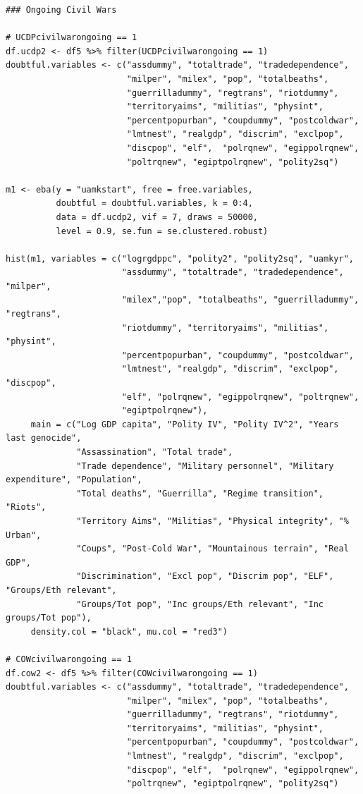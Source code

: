 \begin{verbatim}
### Ongoing Civil Wars

# UCDPcivilwarongoing == 1
df.ucdp2 <- df5 %>% filter(UCDPcivilwarongoing == 1)
doubtful.variables <- c("assdummy", "totaltrade", "tradedependence",
                        "milper", "milex", "pop", "totalbeaths",
                        "guerrilladummy", "regtrans", "riotdummy",
                        "territoryaims", "militias", "physint",
                        "percentpopurban", "coupdummy", "postcoldwar",
                        "lmtnest", "realgdp", "discrim", "exclpop",
                        "discpop", "elf",  "polrqnew", "egippolrqnew",
                        "poltrqnew", "egiptpolrqnew", "polity2sq")

m1 <- eba(y = "uamkstart", free = free.variables,
          doubtful = doubtful.variables, k = 0:4,
          data = df.ucdp2, vif = 7, draws = 50000,
          level = 0.9, se.fun = se.clustered.robust)
          
hist(m1, variables = c("logrgdppc", "polity2", "polity2sq", "uamkyr",
                       "assdummy", "totaltrade", "tradedependence", "milper",
                       "milex","pop", "totalbeaths", "guerrilladummy", "regtrans",
                       "riotdummy", "territoryaims", "militias", "physint",
                       "percentpopurban", "coupdummy", "postcoldwar",
                       "lmtnest", "realgdp", "discrim", "exclpop", "discpop",
                       "elf", "polrqnew", "egippolrqnew", "poltrqnew",
                       "egiptpolrqnew"),
     main = c("Log GDP capita", "Polity IV", "Polity IV^2", "Years last genocide",
              "Assassination", "Total trade", 
              "Trade dependence", "Military personnel", "Military expenditure", "Population", 
              "Total deaths", "Guerrilla", "Regime transition", "Riots",
              "Territory Aims", "Militias", "Physical integrity", "% Urban",
              "Coups", "Post-Cold War", "Mountainous terrain", "Real GDP",
              "Discrimination", "Excl pop", "Discrim pop", "ELF", "Groups/Eth relevant", 
              "Groups/Tot pop", "Inc groups/Eth relevant", "Inc groups/Tot pop"),
     density.col = "black", mu.col = "red3")
     
# COWcivilwarongoing == 1
df.cow2 <- df5 %>% filter(COWcivilwarongoing == 1)
doubtful.variables <- c("assdummy", "totaltrade", "tradedependence",
                        "milper", "milex", "pop", "totalbeaths",
                        "guerrilladummy", "regtrans", "riotdummy",
                        "territoryaims", "militias", "physint",
                        "percentpopurban", "coupdummy", "postcoldwar",
                        "lmtnest", "realgdp", "discrim", "exclpop",
                        "discpop", "elf",  "polrqnew", "egippolrqnew",
                        "poltrqnew", "egiptpolrqnew", "polity2sq")


\end{verbatim}
